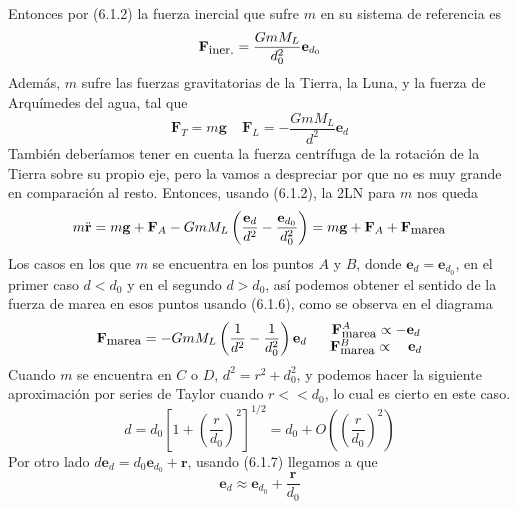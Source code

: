 Entonces por (6.1.2) la fuerza inercial que sufre $m$ en su sistema de referencia es
\begin{equation} \label{6.1.1}
    \mathbf{F}_{\mbox{\small iner.}} = \frac{GmM_L}{d_0^2}\mathbf{e}_{d_0}
\end{equation}  
Además, $m$ sufre las fuerzas gravitatorias de la Tierra, la Luna, y la fuerza de Arquímedes del agua, tal que
\begin{equation} \label{6.1.1}
    \mathbf{F}_T = m\mathbf{g} \ \ \ \ \ \mathbf{F}_L = -\frac{GmM_L}{d^2}\mathbf{e}_d
\end{equation} 
También deberíamos tener en cuenta la fuerza centrífuga de la rotación de la Tierra sobre su propio eje, pero la vamos a despreciar por que no es muy grande en comparación al resto.
Entonces, usando (6.1.2), la 2LN para $m$ nos queda
\begin{equation} \label{6.1.1}
    m \ddot{\mathbf{r}} = m\mathbf{g} + \mathbf{F}_A - GmM_L\left(\frac{\mathbf{e}_d}{d^2}-\frac{\mathbf{e}_{d_0}}{d_0^2}\right) = m\mathbf{g} + \mathbf{F}_A + \mathbf{F}_{\mbox{\small marea}}
\end{equation} 
Los casos en los que $m$ se encuentra en los puntos $A$ y $B$, donde $\mathbf{e}_d=\mathbf{e}_{d_0}$, en el primer caso $d<d_0$ y en el segundo $d>d_0$, así podemos obtener el sentido de la fuerza de marea en esos puntos usando (6.1.6), como se observa en el diagrama 
\begin{equation} \label{6.1.1}
    \mathbf{F}_{\mbox{\small marea}}=-GmM_L\left(\frac{1}{d^2}-\frac{1}{d_0^2}\right)\mathbf{e}_d \ \ \ \ \ \begin{matrix}
        \mathbf{F}^A_{\mbox{\small marea}} \propto -\mathbf{e}_d \\
        \mathbf{F}^B_{\mbox{\small marea}} \propto \ \ \ \mathbf{e}_d
    \end{matrix}
\end{equation} 
Cuando $m$ se encuentra en $C$ o $D$, $d^2=r^2+d_0^2$, y podemos hacer la siguiente aproximación por series de Taylor cuando $r<<d_0$, lo cual es cierto en este caso.
\begin{equation} \label{6.1.1}
    d = d_0\left[1+\left(\frac{r}{d_0}\right)^2\right]^{1/2} = d_0+ O\left(\left(\frac{r}{d_0}\right)^2\right)
\end{equation} 
Por otro lado $d\mathbf{e}_d = d_0\mathbf{e}_{d_0}+ \mathbf{r}$, usando (6.1.7) llegamos a que
\begin{equation} \label{6.1.1}
    \mathbf{e}_d \approx \mathbf{e}_{d_0}+ \frac{\mathbf{r}}{d_0}
\end{equation} 
